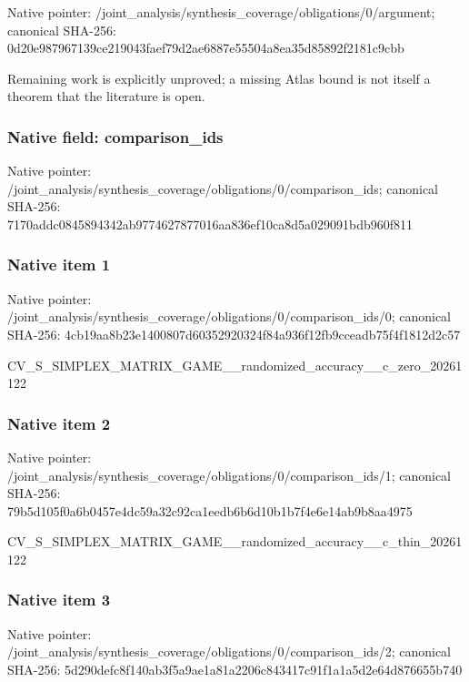 \documentclass[10pt,a4paper]{article}
\begin{document}
Native pointer: /joint\_analysis/synthesi\allowbreak{}s\_coverage/obligations/0\allowbreak{}/argument; canonical SHA-256: 0d20e987967139ce219043fa\allowbreak{}ef79d2ae6887e55504a8ea35\allowbreak{}d85892f2181c9cbb


Remaining work is explicitly unproved; a missing Atlas bound is not itself a theorem that the literature is open.


\subsubsection{Native field: comparison\_ids}


Native pointer: /joint\_analysis/synthesi\allowbreak{}s\_coverage/obligations/0\allowbreak{}/comparison\_ids; canonical SHA-256: 7170addc0845894342ab9774\allowbreak{}627877016aa836ef10ca8d5a\allowbreak{}029091bdb960f811



\subsubsection{Native item 1}


Native pointer: /joint\_analysis/synthesi\allowbreak{}s\_coverage/obligations/0\allowbreak{}/comparison\_ids/0; canonical SHA-256: 4cb19aa8b23e1400807d6035\allowbreak{}2920324f84a936f12fb9ccea\allowbreak{}db75f4f1812d2c57


CV\_S\_SIMPLEX\_MATRIX\_GAME\allowbreak{}\_\_randomized\_accuracy\_\_c\allowbreak{}\_zero\_20261122


\subsubsection{Native item 2}


Native pointer: /joint\_analysis/synthesi\allowbreak{}s\_coverage/obligations/0\allowbreak{}/comparison\_ids/1; canonical SHA-256: 79b5d105f0a6b0457e4dc59a\allowbreak{}32c92ca1eedb6b6d10b1b7f4\allowbreak{}e6e14ab9b8aa4975


CV\_S\_SIMPLEX\_MATRIX\_GAME\allowbreak{}\_\_randomized\_accuracy\_\_c\allowbreak{}\_thin\_20261122


\subsubsection{Native item 3}


Native pointer: /joint\_analysis/synthesi\allowbreak{}s\_coverage/obligations/0\allowbreak{}/comparison\_ids/2; canonical SHA-256: 5d290defc8f140ab3f5a9ae1\allowbreak{}a81a2206c843417c91f1a1a5\allowbreak{}d2e64d876655b740
\end{document}
